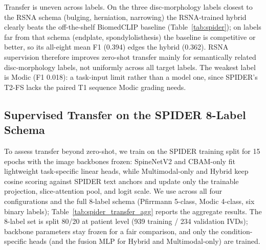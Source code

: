 \documentclass[runningheads]{llncs}
\begin{document}
Transfer is uneven across labels. On the three disc-morphology labels closest to the RSNA schema (bulging, herniation, narrowing) the RSNA-trained hybrid clearly beats the off-the-shelf BiomedCLIP baseline (Table~\ref{tab:spider}); on labels far from that schema (endplate, spondylolisthesis) the baseline is competitive or better, so its all-eight mean F1 (0.394) edges the hybrid (0.362). RSNA supervision therefore improves zero-shot transfer mainly for semantically related disc-morphology labels, not uniformly across all target labels. The weakest label is Modic (F1 0.018): a task-input limit rather than a model one, since SPIDER's T2-FS lacks the paired T1 sequence Modic grading needs.

\subsection{Supervised Transfer on the SPIDER 8-Label Schema}
\label{sec:spider_transfer}

To assess transfer beyond zero-shot, we train on the SPIDER training split for 15 epochs with the image backbones frozen: SpineNetV2 and CBAM-only fit lightweight task-specific linear heads, while Multimodal-only and Hybrid keep cosine scoring against SPIDER text anchors and update only the trainable projection, slice-attention pool, and logit scale. We use across all four configurations and the full 8-label schema (Pfirrmann 5-class, Modic 4-class, six binary labels); Table~\ref{tab:spider_transfer_agg} reports the aggregate results. The 8-label set is split 80/20 at patient level (939 training / 234 validation IVDs); backbone parameters stay frozen for a fair comparison, and only the condition-specific heads (and the fusion MLP for Hybrid and Multimodal-only) are trained.
\end{document}
